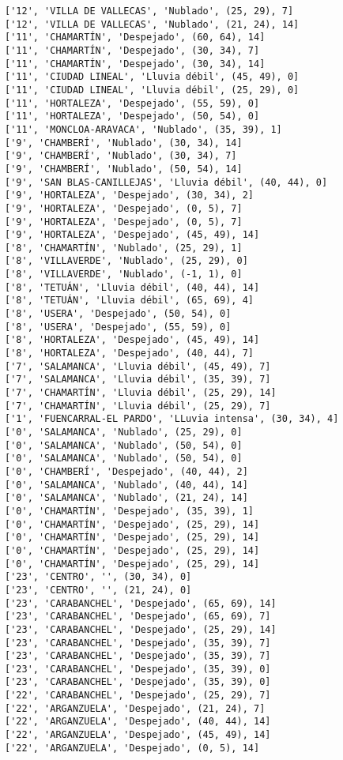 \documentclass[11pt]{article}
\begin{document}
\begin{Verbatim}[commandchars=\\\{\}]
['12', 'VILLA DE VALLECAS', 'Nublado', (25, 29), 7]
['12', 'VILLA DE VALLECAS', 'Nublado', (21, 24), 14]
['11', 'CHAMARTÍN', 'Despejado', (60, 64), 14]
['11', 'CHAMARTÍN', 'Despejado', (30, 34), 7]
['11', 'CHAMARTÍN', 'Despejado', (30, 34), 14]
['11', 'CIUDAD LINEAL', 'Lluvia débil', (45, 49), 0]
['11', 'CIUDAD LINEAL', 'Lluvia débil', (25, 29), 0]
['11', 'HORTALEZA', 'Despejado', (55, 59), 0]
['11', 'HORTALEZA', 'Despejado', (50, 54), 0]
['11', 'MONCLOA-ARAVACA', 'Nublado', (35, 39), 1]
['9', 'CHAMBERÍ', 'Nublado', (30, 34), 14]
['9', 'CHAMBERÍ', 'Nublado', (30, 34), 7]
['9', 'CHAMBERÍ', 'Nublado', (50, 54), 14]
['9', 'SAN BLAS-CANILLEJAS', 'Lluvia débil', (40, 44), 0]
['9', 'HORTALEZA', 'Despejado', (30, 34), 2]
['9', 'HORTALEZA', 'Despejado', (0, 5), 7]
['9', 'HORTALEZA', 'Despejado', (0, 5), 7]
['9', 'HORTALEZA', 'Despejado', (45, 49), 14]
['8', 'CHAMARTÍN', 'Nublado', (25, 29), 1]
['8', 'VILLAVERDE', 'Nublado', (25, 29), 0]
['8', 'VILLAVERDE', 'Nublado', (-1, 1), 0]
['8', 'TETUÁN', 'Lluvia débil', (40, 44), 14]
['8', 'TETUÁN', 'Lluvia débil', (65, 69), 4]
['8', 'USERA', 'Despejado', (50, 54), 0]
['8', 'USERA', 'Despejado', (55, 59), 0]
['8', 'HORTALEZA', 'Despejado', (45, 49), 14]
['8', 'HORTALEZA', 'Despejado', (40, 44), 7]
['7', 'SALAMANCA', 'Lluvia débil', (45, 49), 7]
['7', 'SALAMANCA', 'Lluvia débil', (35, 39), 7]
['7', 'CHAMARTÍN', 'Lluvia débil', (25, 29), 14]
['7', 'CHAMARTÍN', 'Lluvia débil', (25, 29), 7]
['1', 'FUENCARRAL-EL PARDO', 'LLuvia intensa', (30, 34), 4]
['0', 'SALAMANCA', 'Nublado', (25, 29), 0]
['0', 'SALAMANCA', 'Nublado', (50, 54), 0]
['0', 'SALAMANCA', 'Nublado', (50, 54), 0]
['0', 'CHAMBERÍ', 'Despejado', (40, 44), 2]
['0', 'SALAMANCA', 'Nublado', (40, 44), 14]
['0', 'SALAMANCA', 'Nublado', (21, 24), 14]
['0', 'CHAMARTÍN', 'Despejado', (35, 39), 1]
['0', 'CHAMARTÍN', 'Despejado', (25, 29), 14]
['0', 'CHAMARTÍN', 'Despejado', (25, 29), 14]
['0', 'CHAMARTÍN', 'Despejado', (25, 29), 14]
['0', 'CHAMARTÍN', 'Despejado', (25, 29), 14]
['23', 'CENTRO', '', (30, 34), 0]
['23', 'CENTRO', '', (21, 24), 0]
['23', 'CARABANCHEL', 'Despejado', (65, 69), 14]
['23', 'CARABANCHEL', 'Despejado', (65, 69), 7]
['23', 'CARABANCHEL', 'Despejado', (25, 29), 14]
['23', 'CARABANCHEL', 'Despejado', (35, 39), 7]
['23', 'CARABANCHEL', 'Despejado', (35, 39), 7]
['23', 'CARABANCHEL', 'Despejado', (35, 39), 0]
['23', 'CARABANCHEL', 'Despejado', (35, 39), 0]
['22', 'CARABANCHEL', 'Despejado', (25, 29), 7]
['22', 'ARGANZUELA', 'Despejado', (21, 24), 7]
['22', 'ARGANZUELA', 'Despejado', (40, 44), 14]
['22', 'ARGANZUELA', 'Despejado', (45, 49), 14]
['22', 'ARGANZUELA', 'Despejado', (0, 5), 14]

\end{Verbatim}
\end{document}
